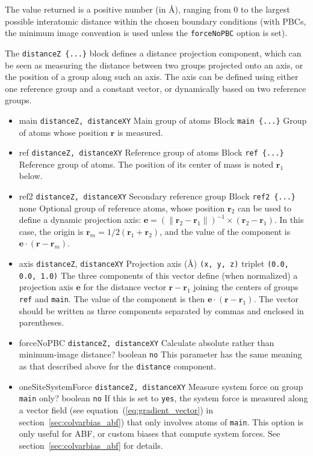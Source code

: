 The value returned is a positive number (in \AA), ranging from $0$
to the largest possible interatomic distance within the chosen
boundary conditions (with PBCs, the minimum image convention is used
unless the \texttt{forceNoPBC} option is set).


The \texttt{distanceZ~\{...\}} block defines a distance projection
component, which can be seen as measuring the distance between two
groups projected onto an axis, or the position of a group along such
an axis.  The axis can be defined using either one reference group and
a constant vector, or dynamically based on two reference groups.
\begin{itemize}
\item %
  \key
    {main}{%
    \texttt{distanceZ, \texttt{distanceXY}}}{%
    Main group of atoms}{%
    Block \texttt{main \{...\}}}{%
    Group of atoms whose position $\bm{r}$ is measured.}
\item %
  \key
    {ref}{%
    \texttt{distanceZ, \texttt{distanceXY}}}{%
    Reference group of
    atoms}{%
    Block \texttt{ref \{...\}}}{%
    Reference group of atoms.  The position of its center of mass is
    noted $\bm{r}_1$ below.}
\item %
  \keydef
    {ref2}{%
    \texttt{distanceZ, \texttt{distanceXY}}}{%
    Secondary reference
    group}{%
    Block \texttt{ref2 \{...\}}}{%
    none}{%
    Optional group of reference atoms, whose position $\bm{r}_2$ can
    be used to define a dynamic projection axis: $\bm{e}=(\| \bm{r}_2
    - \bm{r}_1\|)^{-1} \times (\bm{r}_2 - \bm{r}_1)$.  In this case,
    the origin is $\bm{r}_m = 1/2 (\bm{r}_1+\bm{r}_2)$, and the value
    of the component is $\bm{e} \cdot (\bm{r}-\bm{r}_m)$.}
\item %
  \keydef
    {axis}{%
    \texttt{distanceZ}, \texttt{distanceXY}}{%
    Projection axis (\AA{})}{%
    \texttt{(x, y, z)} triplet}{%
    \texttt{(0.0, 0.0, 1.0)}}{%
    The three components of this vector define (when normalized) a
    projection axis $\bm{e}$ for the distance vector $\bm{r} -
    \bm{r}_1$ joining the centers of groups \texttt{ref} and
    \texttt{main}. The value of the component is then $\bm{e} \cdot
    (\bm{r}-\bm{r}_1)$.  The vector should be written as three
    components separated by commas and enclosed in parentheses.}
\item %
  \keydef
    {forceNoPBC}{%
    \texttt{distanceZ, distanceXY}}{%
    Calculate absolute rather than minimum-image distance?}{%
    boolean}{%
    \texttt{no}}{%
    This parameter has the same meaning as that described above for the \texttt{distance}
    component.}
\item %
  \keydef
    {oneSiteSystemForce}{%
    \texttt{distanceZ, distanceXY}}{%
    Measure system force on group \texttt{main} only?}{%
    boolean}{%
    \texttt{no}}{%
    If this is set to \texttt{yes}, the system force is measured along a
    vector field (see equation~(\ref{eq:gradient_vector}) in
    section~\ref{sec:colvarbias_abf}) that only involves atoms of \texttt{main}.
    This option is only useful for ABF, or custom biases that compute
    system forces.  See section~\ref{sec:colvarbias_abf} for details.}
\end{itemize}
